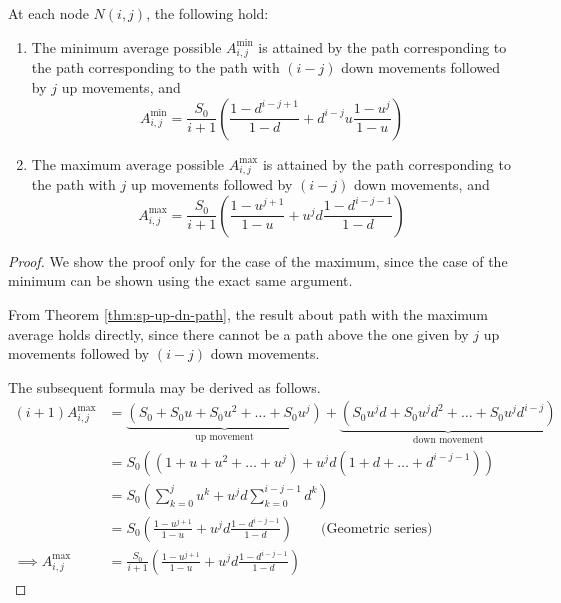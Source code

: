 \begin{crr}
	\label{crr:sp-up-dn-path}
	At each node $ N(i,j) $, the following hold:
	\begin{enumerate}
	\item The minimum average possible $ A_{i,j}^{\min} $ is attained by the path corresponding to the path corresponding to the path with $(i-j)$ down movements followed by $j$ up movements, and
		\begin{equation}	\label{eq:sp-Amin}
			A_{i,j}^{\min} = \frac{S_0}{i+1} \left( \frac{1 - d^{i-j+1}}{1-d} + d^{i-j} u \frac{1 - u^{j}}{1-u} \right)
		\end{equation}
	\item The maximum average possible $ A_{i,j}^{\max} $ is attained by the path corresponding to the path with $j$ up movements followed by $(i-j)$ down movements, and
		\begin{equation} \label{eq:sp-Amax}
			A_{i,j}^{\max} = \frac{S_0}{i+1} \left( \frac{1 - u^{j+1}}{1-u} + u^{j} d \frac{1 - d^{i-j-1}}{1-d} \right)
		\end{equation}
	\end{enumerate}
\end{crr}

\begin{proof}
	We show the proof only for the case of the maximum, since the case of the minimum can be shown using the exact same argument.
	
	From Theorem \ref{thm:sp-up-dn-path}, the result about path with the maximum average holds directly, since there cannot be a path above the one given by $j$ up movements followed by $(i-j)$ down movements.
	
	The subsequent formula may be derived as follows.
	\begin{align*}
		(i+1) A_{i,j}^{\max} &= \underbrace{ ( S_0 + S_0 u + S_0 u^2 + \dots + S_0 u^j ) }_\text{up movement} + \underbrace{ ( S_0 u^j d + S_0 u^j d^2 + \dots + S_0 u^j d^{i-j} ) }_\text{down movement} \\
												 &= S_0 ( (1 + u + u^2 + \dots + u^j ) + u^j d ( 1 + d + \dots + d^{i-j-1} ) ) \\
												 &= S_0 \left( \sum_{k=0}^j u^k + u^j d \sum_{k=0}^{i-j-1} d^k \right) \\
												 &= S_0 \left( \frac{1 - u^{j+1}}{1-u} + u^{j} d \frac{1 - d^{i-j-1}}{1-d} \right) \qquad \text{(Geometric series)} \\
		\implies A_{i,j}^{\max} &= \frac{S_0}{i+1} \left( \frac{1 - u^{j+1}}{1-u} + u^{j} d \frac{1 - d^{i-j-1}}{1-d} \right)
	\end{align*}
\end{proof}

